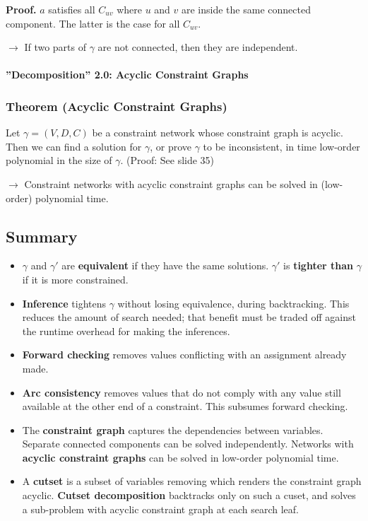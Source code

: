 \documentclass[conference, a4paper]{styles/acmsiggraph}
\newcommand\subsubsubsection{\paragraph}
\begin{document}
                \textbf{Proof.}
                $a$ satisfies all $C_{uv}$ where $u$ and $v$ are inside the same connected component.
                The latter is the case for all $C_{uv}$.\newline
                
                $\rightarrow$ If two parts of $\gamma$ are not connected, then they are independent.
        
        \subsubsubsection{''Decomposition'' 2.0: Acyclic Constraint Graphs}
            \subsubsection{Theorem (Acyclic Constraint Graphs)}
                Let $\gamma = (V,D,C)$ be a constraint network whose constraint graph is acyclic.
                Then we can find a solution for $\gamma$, or prove $\gamma$ to be inconsistent, in time low-order polynomial in the size of $\gamma$. (Proof: See slide 35)\newline
                
                $\rightarrow$ Constraint networks with acyclic constraint graphs can be solved in (low-order) polynomial time.
    
    \subsection{Summary}
        \begin{itemize}
            \item $\gamma$ and $\gamma'$ are \textbf{equivalent} if they have the same solutions.
            $\gamma'$ is \textbf{tighter than} $\gamma$ if it is more constrained.
            \item \textbf{Inference} tightens $\gamma$ without losing equivalence, during backtracking.
            This reduces the amount of search needed; that benefit must be traded off against the runtime overhead for making the inferences.
            \item \textbf{Forward checking} removes values conflicting with an assignment already made.
            \item \textbf{Arc consistency} removes values that do not comply with any value still available at the other end of a constraint.
            This subsumes forward checking.
            \item The \textbf{constraint graph} captures the dependencies between variables.
            Separate connected components can be solved independently.
            Networks with \textbf{acyclic constraint graphs} can be solved in low-order polynomial time.
            \item A \textbf{cutset} is a subset of variables removing which renders the constraint graph acyclic.
            \textbf{Cutset decomposition} backtracks only on such a cuset, and solves a sub-problem with acyclic constraint graph at each search leaf.
        \end{itemize}
        
\end{document}
